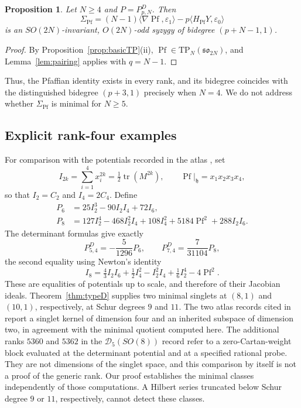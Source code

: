 \documentclass[10pt,reqno]{amsart}
\numberwithin{equation}{section}
\theoremstyle{plain}
\newtheorem{proposition}[theorem]{Proposition}
\theoremstyle{definition}
\DeclareMathOperator{\tr}{tr}
\DeclareMathOperator{\Pf}{Pf}
\newcommand{\TP}{\mathrm{TP}}
\newcommand{\ip}[2]{\langle #1, #2\rangle}
\begin{document}
\begin{proposition}\label{prop:Pf-all-N}
Let $N\ge4$ and $P=P^D_{p,N}$. Then
\begin{equation}
	\Sigma_{\Pf}=(N-1)\ip{\nabla\Pf}{\varepsilon_1}-p\ip{H_{\Pf}Y}{\varepsilon_0}
\end{equation}
is an $SO(2N)$-invariant, $O(2N)$-odd syzygy of bidegree $(p+N-1,1)$.
\end{proposition}

\begin{proof}
By Proposition~\ref{prop:basicTP}(ii), $\Pf\in\TP_N(\mathfrak{so}_{2N})$, and Lemma~\ref{lem:pairing} applies with $q=N-1$.
\end{proof}

Thus, the Pfaffian identity exists in every rank, and its bidegree coincides with the distinguished bidegree $(p+3,1)$ precisely when $N=4$. We do not address whether $\Sigma_{\Pf}$ is minimal for $N\ge5$.

\subsection{Explicit rank-four examples}\label{sec:rank4}

For comparison with the potentials recorded in the atlas \cite{atlas}, set
\begin{equation*}
	I_{2k}=\sum_{i=1}^4x_i^{2k}=\tfrac12\tr(M^{2k}),\qquad \Pf|_\mathfrak{h}=x_1x_2x_3x_4 ,
\end{equation*}
so that $I_2=C_2$ and $I_4=2C_4$. Define
\begin{align*}
	P_6&=25I_2^3-90I_2I_4+72I_6,\\
	P_8&=127I_2^4-468I_2^2I_4+108I_4^2+5184\Pf^2+288I_2I_6 .
\end{align*}
The determinant formulas give exactly
\begin{equation*}
	P^D_{5,4}=-\frac5{1296}P_6,\qquad P^D_{7,4}=\frac7{31104}P_8 ,
\end{equation*}
the second equality using Newton's identity
\begin{equation*}
	I_8=\tfrac43I_2I_6+\tfrac12I_4^2-I_2^2I_4+\tfrac16I_2^4-4\Pf^2 .
\end{equation*}
These are equalities of potentials up to scale, and therefore of their Jacobian ideals. Theorem~\ref{thm:typeD} supplies two minimal singlets at $(8,1)$ and $(10,1)$, respectively, at Schur degrees $9$ and $11$. The two atlas records cited in \cite{atlas} report a singlet kernel of dimension four and an inherited subspace of dimension two, in agreement with the minimal quotient computed here. The additional ranks $5360$ and $5362$ in the $\mathcal{D}_5(SO(8))$ record refer to a zero-Cartan-weight block evaluated at the determinant potential and at a specified rational probe. They are not dimensions of the singlet space, and this comparison by itself is not a proof of the generic rank. Our proof establishes the minimal classes independently of those computations. A Hilbert series truncated below Schur degree $9$ or $11$, respectively, cannot detect these classes.
\end{document}
